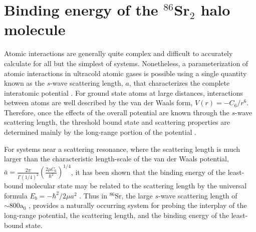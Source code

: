 \chapter{Binding energy of the $^{86}$Sr$_2$ halo molecule} \label{ch:chap5}
Atomic interactions are generally quite complex and difficult to accurately calculate for all but the simplest of systems.
Nonetheless, a parameterization of atomic interactions in ultracold atomic gases is possible using a single quantity known as the $s$-wave scattering length, $a$, that characterizes the complete interatomic potential \cite{Julienne2009a}.
For ground state atoms at large distances, interactions between atoms are well described by the van der Waals form, $V(r)=-C_6/r^6$. 
Therefore, once the effects of the overall potential are known through the $s$-wave scattering length, the threshold bound state and scattering properties are determined mainly by the long-range portion of the potential \cite{Jones2006}.

For systems near a scattering resonance, where the scattering length is much larger than the characteristic length-scale of the van der Waals potential, $\bar{a}=\frac{2 \pi}{\Gamma(1/4)^2} \left( \frac{2 \mu C_6}{\hbar^2} \right)^{1/4}$, it has been shown that the binding energy of the least-bound molecular state may be related to the scattering length by the universal formula $E_b=-\hbar^2/2 \mu a^2$ \cite{fks96,gao04,Julienne2006}.
Thus in $^{86}$Sr, the large $s$-wave scattering length of $\sim\!800\text{a}_0$ \cite{Stein2010}, provides a naturally occurring system for probing the interplay of the long-range potential, the scattering length, and the binding energy of the least-bound state.

%
%
%


